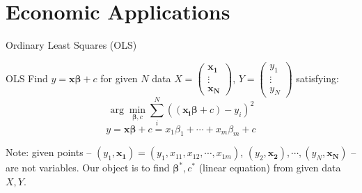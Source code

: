 \documentclass[a4paper,11pt]{article}
\newcommand{\bd}{\mathbf}
\begin{document}
\section{Economic Applications} %
\label{sec:economic_applications}
\begin{frame}[t]{Ordinary Least Squares (OLS)}
	\begin{block}
		{OLS}
		Find $y=\bd{x}\bd{\beta}+{c}$ for given $N$ data $X = \begin{pmatrix}
			\bd{x_1}\\
			\vdots\\
			\bd{x_N}
		\end{pmatrix}$, $Y=\begin{pmatrix}
			y_1\\
			\vdots\\
			y_N
		\end{pmatrix}$ satisfying:
		\[
			\arg\min_{\bd{\beta},{c}} \sum_i^N ((\bd{x_i}\bd{\beta}+{c})-y_i)^2 \tag{Least Square}
		\]\[
			y=\bd{x}\bd{\beta}+{c} = x_1 \beta_1 + \cdots + x_m \beta_m + {c}
		\]%
	\end{block}
	Note: given points -- $(y_1, \bd{x_1}) = (y_1, x_{11},x_{12},\cdots,x_{1m})$, $(y_2,\bd{x_2}), \cdots , (y_N,\bd{x_N})$ -- are not variables. Our object is to find $\bd{\beta^\ast}, {c^\ast}$ (linear equation) from given data $X,Y$.
\end{frame}
\end{document}
